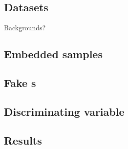 %

%

\subsection*{Datasets}
%

\begin{frame}
\begin{center}
\LARGE Backgrounds?
\end{center}
\end{frame}
\addtocounter{framenumber}{-1}



\subsection*{Embedded samples}


\subsection*{Fake \tauh s}


\subsection*{Discriminating variable}


\subsection*{Results}
